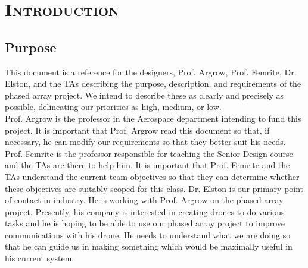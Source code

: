 \documentclass[ProductRequirements.tex]{subfiles}
\begin{document}
\bigskip

\section{\textsc{\Large Introduction}}
	
	\subsection{Purpose}
	
	This document is a reference for the designers, Prof. Argrow, Prof. Femrite, Dr. Elston, and the TAs describing the purpose, description, and requirements of the phased array project. We intend to describe these as clearly and precisely as possible, delineating our priorities as high, medium, or low. \\

Prof. Argrow is the professor in the Aerospace department intending to fund this project. It is important that Prof. Argrow read this document so that, if necessary, he can modify our requirements so that they better suit his needs. Prof. Femrite is the professor responsible for teaching the Senior Design course and the TAs are there to help him. It is important that Prof. Femrite and the TAs understand the current team objectives so that they can determine whether these objectives are suitably scoped for this class. Dr. Elston is our primary point of contact in industry. He is working with Prof. Argrow on the phased array project. Presently, his company is interested in creating drones to do various tasks and he is hoping to be able to use our phased array project to improve communications with his drone. He needs to understand what we are doing so that he can guide us in making something which would be maximally useful in his current system.
\end{document}
